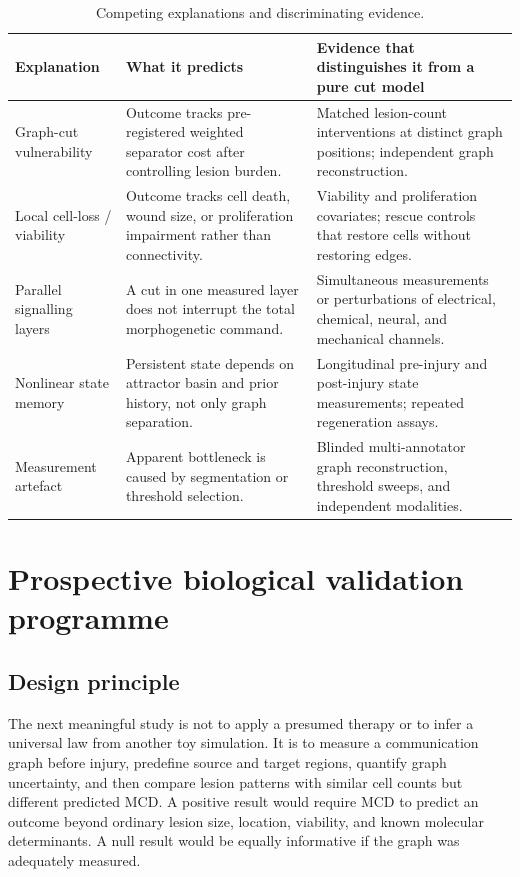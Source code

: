 \documentclass[12pt,a4paper]{article}
\begin{document}
\begin{table}[H]
\centering\small
\caption{Competing explanations and discriminating evidence.}
\begin{tabularx}{\textwidth}{p{}p{}X}
\toprule
Explanation & What it predicts & Evidence that distinguishes it from a pure cut model\\
\midrule
Graph-cut vulnerability & Outcome tracks pre-registered weighted separator cost after controlling lesion burden. & Matched lesion-count interventions at distinct graph positions; independent graph reconstruction.\\
Local cell-loss / viability & Outcome tracks cell death, wound size, or proliferation impairment rather than connectivity. & Viability and proliferation covariates; rescue controls that restore cells without restoring edges.\\
Parallel signalling layers & A cut in one measured layer does not interrupt the total morphogenetic command. & Simultaneous measurements or perturbations of electrical, chemical, neural, and mechanical channels.\\
Nonlinear state memory & Persistent state depends on attractor basin and prior history, not only graph separation. & Longitudinal pre-injury and post-injury state measurements; repeated regeneration assays.\\
Measurement artefact & Apparent bottleneck is caused by segmentation or threshold selection. & Blinded multi-annotator graph reconstruction, threshold sweeps, and independent modalities.\\
\bottomrule
\end{tabularx}
\end{table}

\section{Prospective biological validation programme}
\subsection{Design principle}
The next meaningful study is not to apply a presumed therapy or to infer a universal law from another toy simulation. It is to measure a communication graph before injury, predefine source and target regions, quantify graph uncertainty, and then compare lesion patterns with similar cell counts but different predicted MCD. A positive result would require MCD to predict an outcome beyond ordinary lesion size, location, viability, and known molecular determinants. A null result would be equally informative if the graph was adequately measured.
\end{document}
